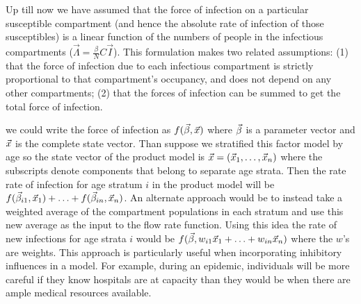 Up till now we have assumed that the force of infection on a particular susceptible compartment (and hence the absolute rate of infection of those susceptibles) is a linear function of the numbers of people in the infectious compartments ($\vec{\Lambda} = \frac{\beta}{N} C \vec{I}$). This formulation makes two related assumptions: (1) that the force of infection due to each infectious compartment is strictly proportional to that compartment's occupancy, and does not depend on any other compartments; (2) that the forces of infection can be summed to get the total force of infection.

we could write the force of infection as $f(\vec{\beta}, \vec{x})$ where $\vec{\beta}$ is a parameter vector and $\vec{x}$ is the complete state vector. Than suppose we stratified this factor model by age so the state vector of the product model is $\vec{x} = (\vec{x}_1, \ldots, \vec{x}_n)$ where the subscripts denote components that belong to separate age strata. Then the \pc rate rate of infection for age stratum $i$ in the product model will be $f(\vec{\beta}_{i1}, \vec{x}_1) + \ldots + f(\vec{\beta}_{in}, \vec{x}_n)$. An alternate approach would be to instead take a weighted average of the compartment populations in each stratum and use this new average as the input to the flow rate function. Using this idea the \pc rate of new infections for age strata $i$ would be $f(\vec{\beta}, w_{i1}\vec{x}_1 + \ldots + w_{in}\vec{x}_n)$ where the $w$'s are weights. This approach is particularly useful when incorporating inhibitory influences in a model. For example, during an epidemic, individuals will be more careful if they know hospitals are at capacity than they would be when there are ample medical resources available. 

